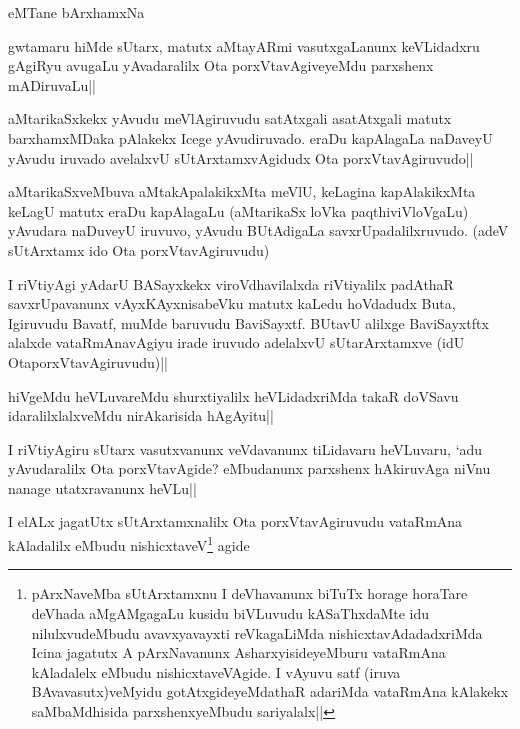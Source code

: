 \begin{center}
eMTane bArxhamxNa
\end{center}

\begin{artha}%
gwtamaru hiMde sUtarx, matutx aMtayARmi vasutxgaLanunx keVLidadxru gAgiRyu avugaLu yAvadaralilx Ota porxVtavAgiveyeMdu parxshenx mADiruvaLu||
\end{artha}


\begin{artha}
aMtarikaSxkekx yAvudu meVlAgiruvudu satAtxgali asatAtxgali matutx barxhamxMDaka pAlakekx Icege yAvudiruvado. eraDu kapAlagaLa naDaveyU yAvudu iruvado avelalxvU sUtArxtamxvAgidudx Ota porxVtavAgiruvudo||
\end{artha}


\begin{artha}
aMtarikaSxveMbuva aMtakApalakikxMta meVlU, keLagina kapAlakikxMta keLagU matutx eraDu kapAlagaLu (aMtarikaSx loVka paqthiviVloVgaLu) yAvudara naDuveyU iruvuvo, yAvudu BUtAdigaLa savxrUpadalilxruvudo. (adeV sUtArxtamx ido Ota porxVtavAgiruvudu)
\end{artha}

\begin{artha}
I riVtiyAgi yAdarU BASayxkekx viroVdhavilalxda riVtiyalilx padAthaR savxrUpavanunx vAyxKAyxnisabeVku matutx kaLedu hoVdadudx Buta, Igiruvudu Bavatf, muMde baruvudu BaviSayxtf. BUtavU alilxge BaviSayxtftx alalxde vataRmAnavAgiyu irade iruvudo adelalxvU sUtarArxtamxve (idU OtaporxVtavAgiruvudu)||

hiVgeMdu heVLuvareMdu shurxtiyalilx heVLidadxriMda takaR doVSavu idaralilxlalxveMdu nirAkarisida hAgAyitu||
\end{artha}%

\begin{artha}
I riVtiyAgiru sUtarx vasutxvanunx veVdavanunx tiLidavaru heVLuvaru, `adu yAvudaralilx Ota porxVtavAgide? eMbudanunx parxshenx hAkiruvAga niVnu nanage utatxravanunx heVLu||
\end{artha}


\begin{artha}
I elALx jagatUtx sUtArxtamxnalilx Ota porxVtavAgiruvudu vataRmAna kAladalilx eMbudu nishicxtaveV\footnote[1]{pArxNaveMba sUtArxtamxnu I deVhavanunx biTuTx horage horaTare deVhada aMgAMgagaLu kusidu biVLuvudu kASaThxdaMte idu nilulxvudeMbudu avavxyavayxti reVkagaLiMda nishicxtavAdadadxriMda Icina jagatutx A pArxNavanunx AsharxyisideyeMburu vataRmAna kAladalelx eMbudu nishicxtaveVAgide. I vAyuvu satf (iruva BAvavasutx)veMyidu gotAtxgideyeMdathaR adariMda vataRmAna kAlakekx saMbaMdhisida parxshenxyeMbudu sariyalalx||} agide
\end{artha}

